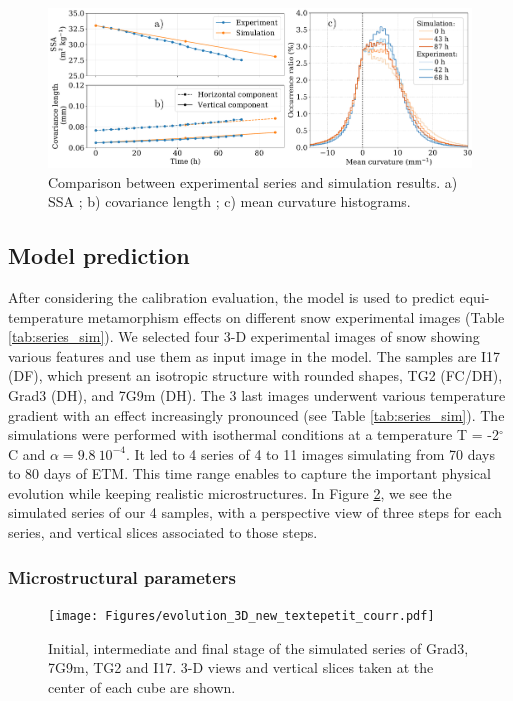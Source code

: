 \documentclass[draft,ms]{agujournal2019}
\begin{document}
\begin{figure}
    \centering
    \includegraphics[width=\linewidth]{Figures/microstruct_EBONI_exp_simu.pdf}
    \caption{Comparison between \protect{} experimental series and simulation results. a) SSA ; b) covariance length ; c) mean curvature histograms.}
    \label{fig:eboni}
\end{figure}


\subsection{Model prediction}
\label{sec:prediction}

After considering the calibration evaluation, the model is used to predict equi-temperature metamorphism effects on different snow experimental images (Table \ref{tab:series_sim}). We selected four 3-D experimental images of snow showing various features and use them as input image in the model. The samples are I17 (DF), which present an isotropic structure with rounded shapes, TG2 (FC/DH), Grad3 (DH), and 7G9m (DH). The 3 last images underwent various temperature gradient with an effect increasingly pronounced (see Table \ref{tab:series_sim}). The simulations were performed with isothermal conditions at a temperature T = -2$^\circ$C and $\alpha = 9.8\ 10^{-4}$. It led to 4 series of 4 to 11 images simulating from 70 days to 80 days of ETM. This time range enables to capture the important physical evolution while keeping realistic microstructures. In Figure \ref{fig:evolutions_3D}, we see the simulated series of our 4 samples, with a perspective view of three steps for each series, and vertical slices associated to those steps.\\



\subsubsection{Microstructural parameters}
\begin{figure}
    \centering
    \texttt{[image: Figures/evolution\_3D\_new\_textepetit\_courr.pdf]}
    \caption{Initial, intermediate and final stage of the simulated series of Grad3, 7G9m, TG2 and I17. 3-D views and vertical slices taken at the center of each cube are shown.}
    \label{fig:evolutions_3D}
\end{figure}
\end{document}
